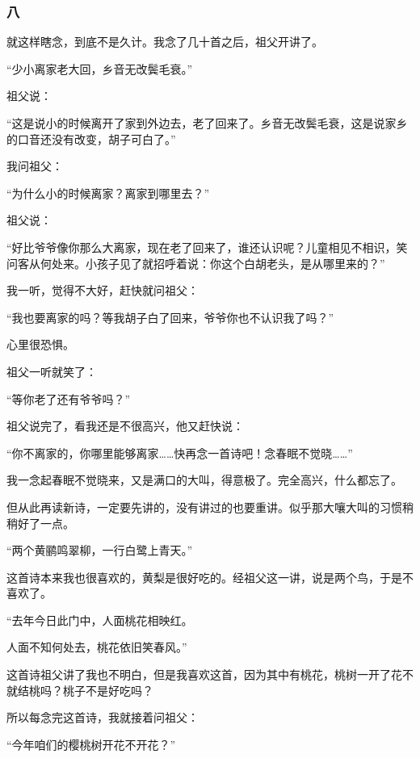 \subsubsection*{八}
\par 就这样瞎念，到底不是久计。我念了几十首之后，祖父开讲了。
\par “少小离家老大回，乡音无改鬓毛衰。”
\par 祖父说：
\par “这是说小的时候离开了家到外边去，老了回来了。乡音无改鬓毛衰，这是说家乡的口音还没有改变，胡子可白了。”
\par 我问祖父：
\par “为什么小的时候离家？离家到哪里去？”
\par 祖父说：
\par “好比爷爷像你那么大离家，现在老了回来了，谁还认识呢？儿童相见不相识，笑问客从何处来。小孩子见了就招呼着说：你这个白胡老头，是从哪里来的？”
\par 我一听，觉得不大好，赶快就问祖父：
\par “我也要离家的吗？等我胡子白了回来，爷爷你也不认识我了吗？”
\par 心里很恐惧。
\par 祖父一听就笑了：
\par “等你老了还有爷爷吗？”
\par 祖父说完了，看我还是不很高兴，他又赶快说：
\par “你不离家的，你哪里能够离家……快再念一首诗吧！念春眠不觉晓……”
\par 我一念起春眠不觉晓来，又是满口的大叫，得意极了。完全高兴，什么都忘了。
\par 但从此再读新诗，一定要先讲的，没有讲过的也要重讲。似乎那大嚷大叫的习惯稍稍好了一点。
\par “两个黄鹂鸣翠柳，一行白鹭上青天。”
\par 这首诗本来我也很喜欢的，黄梨是很好吃的。经祖父这一讲，说是两个鸟，于是不喜欢了。
\par “去年今日此门中，人面桃花相映红。
\par 人面不知何处去，桃花依旧笑春风。”
\par 这首诗祖父讲了我也不明白，但是我喜欢这首，因为其中有桃花，桃树一开了花不就结桃吗？桃子不是好吃吗？
\par 所以每念完这首诗，我就接着问祖父：
\par “今年咱们的樱桃树开花不开花？”
